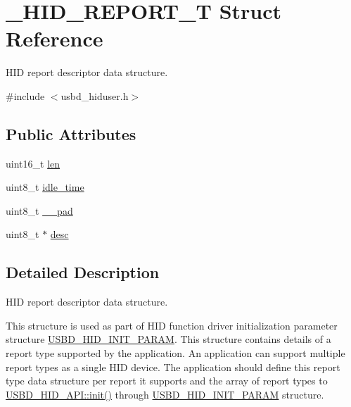 \hypertarget{struct___h_i_d___r_e_p_o_r_t___t}{}\section{\+\_\+\+H\+I\+D\+\_\+\+R\+E\+P\+O\+R\+T\+\_\+T Struct Reference}
\label{struct___h_i_d___r_e_p_o_r_t___t}


H\+ID report descriptor data structure.  




{\ttfamily \#include $<$usbd\+\_\+hiduser.\+h$>$}

\subsection*{Public Attributes}
\begin{DoxyCompactItemize}
\item 
uint16\+\_\+t \hyperlink{struct___h_i_d___r_e_p_o_r_t___t_a4c0e68b7360c08788605db4eb667cb4e}{len}
\item 
uint8\+\_\+t \hyperlink{struct___h_i_d___r_e_p_o_r_t___t_a388e7eacbfc2006e0ada9e81da54760b}{idle\+\_\+time}
\item 
uint8\+\_\+t \hyperlink{struct___h_i_d___r_e_p_o_r_t___t_a9d56a95a8b9dbdc3bfaec651d23bd360}{\+\_\+\+\_\+pad}
\item 
uint8\+\_\+t $\ast$ \hyperlink{struct___h_i_d___r_e_p_o_r_t___t_a312421c8506e4dcd1ba2d40a9c409211}{desc}
\end{DoxyCompactItemize}


\subsection{Detailed Description}
H\+ID report descriptor data structure. 

This structure is used as part of H\+ID function driver initialization parameter structure \hyperlink{struct_u_s_b_d___h_i_d___i_n_i_t___p_a_r_a_m}{U\+S\+B\+D\+\_\+\+H\+I\+D\+\_\+\+I\+N\+I\+T\+\_\+\+P\+A\+R\+AM}. This structure contains details of a report type supported by the application. An application can support multiple report types as a single H\+ID device. The application should define this report type data structure per report it supports and the array of report types to \hyperlink{struct_u_s_b_d___h_i_d___a_p_i_a7b98c434713f1deb07abafcb52fae76d}{U\+S\+B\+D\+\_\+\+H\+I\+D\+\_\+\+A\+P\+I\+::init()} through \hyperlink{struct_u_s_b_d___h_i_d___i_n_i_t___p_a_r_a_m}{U\+S\+B\+D\+\_\+\+H\+I\+D\+\_\+\+I\+N\+I\+T\+\_\+\+P\+A\+R\+AM} structure.

